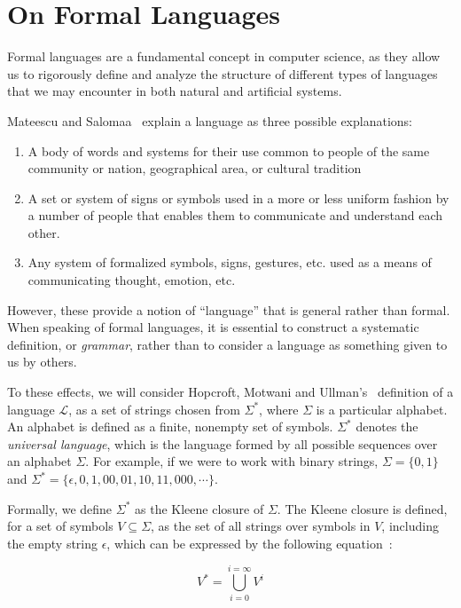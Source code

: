 \chapter{On Formal Languages} \label{chapter:2}
Formal languages are a fundamental concept in computer science, as they allow us to rigorously define and analyze the structure of different types of languages that we may encounter in both natural and artificial systems. 

Mateescu and Salomaa~\cite{handbook-formal-languages} explain a language as three possible explanations: 

\begin{enumerate}
    \item A body of words and systems for their use common to people of the same community or nation, geographical area, or cultural tradition
    \item A set or system of signs or symbols used in a more or less uniform fashion by a number of people that enables them to communicate and understand each other.
    \item Any system of formalized symbols, signs, gestures, etc. used as a means of communicating thought, emotion, etc.
\end{enumerate}

However, these provide a notion of ``language'' that is general rather than formal. When speaking of formal languages, it is essential to construct a systematic definition, or \emph{grammar}, rather than to consider a language as something given to us by others. 

To these effects, we will consider Hopcroft, Motwani and Ullman's~\cite{hopcroft-automata} definition of a language $\mathcal{L}$, as a set of strings chosen from $\Sigma^*$, where $\Sigma$ is a particular alphabet. An alphabet is defined as a finite, nonempty set of symbols. $\Sigma^*$ denotes the \emph{universal language}, which is the language formed by all possible sequences over an alphabet $\Sigma$.  For example, if we were to work with binary strings, $\Sigma = \{0, 1\}$ and $\Sigma^* = \{ \epsilon, 0, 1, 00, 01, 10, 11, 000, \cdots \}$. 

Formally, we define $\Sigma^*$ as the Kleene closure of $\Sigma$. The Kleene closure is defined, for a set of symbols $V \subseteq \Sigma$, as the set of all strings over symbols in $V$, including the empty string $\epsilon$, which can be expressed by the following equation~\cite{kleene-star}:

\begin{equation}\label{eq:kleene}
    V^* = \bigcup_{i=0}^{i=\infty} V^i
\end{equation}

